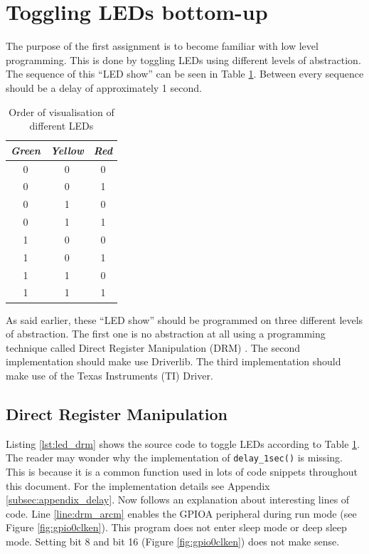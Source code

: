 \section{Toggling LEDs bottom-up}

The purpose of the first assignment is to become familiar with low level programming.
This is done by toggling LEDs using different levels of abstraction.
The sequence of this \enquote{LED show} can be seen in Table \ref{tab:led_scheme}.
Between every sequence should be a delay of approximately 1 second.

\begin{table}[H]
    \centering
    \begin{tabular}{|c|c|c|}
        \hline
        \textcolor{darkpink}{\textit{Green}} & \textcolor{darkpink}{\textit{Yellow}} & \textcolor{darkpink}{\textit{Red}}\\
        \hline
        0 & 0 & 0 \\
        \hline
        0 & 0 & 1 \\
        \hline
        0 & 1 & 0 \\
        \hline
        0 & 1 & 1 \\
        \hline
        1 & 0 & 0 \\
        \hline
        1 & 0 & 1 \\
        \hline
        1 & 1 & 0 \\
        \hline
        1 & 1 & 1 \\
        \hline
    \end{tabular}
        
    \label{tab:led_scheme}
    \caption{Order of visualisation of different LEDs}
\end{table}

As said earlier, these \enquote{LED show} should be programmed on three different levels of abstraction.
The first one is no abstraction at all using a programming technique called Direct Register Manipulation (DRM) \cite{IntroEmbeddedSystems}.
The second implementation should make use Driverlib.
The third implementation should make use of the Texas Instruments (TI) Driver.

\newpage
\subsection{Direct Register Manipulation}
\label{subsec:led_drm}

Listing \ref{lst:led_drm} shows the source code to toggle LEDs according to Table \ref{tab:led_scheme}.
The reader may wonder why the implementation of \texttt{delay\_1sec()} is missing. 
This is because it is a common function used in lots of code snippets throughout this document.
For the implementation details see Appendix \ref{subsec:appendix_delay}.
Now follows an explanation about interesting lines of code.
Line \ref{line:drm_arcm} enables the GPIOA peripheral during run mode (see Figure \ref{fig:gpio0clken}).
This program does not enter sleep mode or deep sleep mode. Setting bit 8 and bit 16 (Figure \ref{fig:gpio0clken}) does not make sense.

